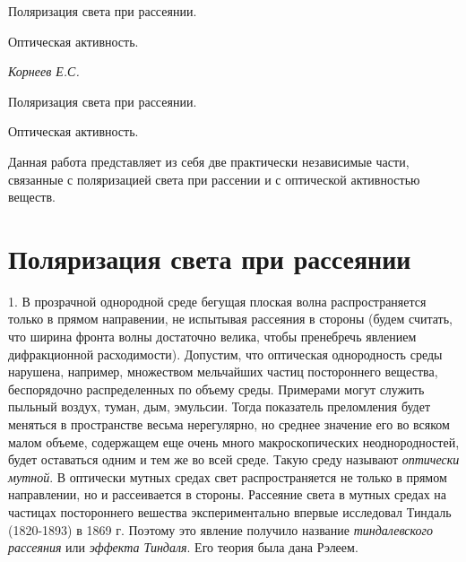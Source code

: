 \documentclass[14pt]{article}
\begin{document}
\begin{titlepage}
	\begin{center}
		\vspace*{6cm}
		\fontsize{24pt}{25pt}\selectfont
		Поляризация света при рассеянии.
		
		Оптическая активность.
	\end{center}
	\begin{flushright}
		\fontsize{18pt}{20pt}\selectfont
		\vspace{12cm}
		\hspace{-3cm}
		\textit{Корнеев Е.С.}
	\end{flushright}		
\end{titlepage}

\begin{center}
	\fontsize{16pt}{18pt}\selectfont
	Поляризация света при рассеянии.
		
	Оптическая активность.
\end{center}

\fontsize{14pt}{16pt}\selectfont
Данная работа представляет из себя две практически независимые части, связанные с поляризацией света при рассении и с оптической активностью веществ.

\section{Поляризация света при рассеянии}

1. В прозрачной однородной среде бегущая плоская волна распространяется только в прямом направении, не испытывая рассеяния в стороны (будем считать, что ширина фронта волны достаточно велика, чтобы пренебречь явлением дифракционной расходимости). Допустим, что оптическая однородность среды нарушена, например, множеством мельчайших частиц постороннего вещества, беспорядочно распределенных по объему среды. Примерами могут служить пыльный воздух, туман, дым, эмульсии. Тогда показатель преломления будет меняться в пространстве весьма нерегулярно, но среднее значение его во всяком малом объеме, содержащем еще очень много макроскопических неоднородностей, будет оставаться одним и тем же во всей среде. Такую среду называют \textsl{оптически мутной}. В оптически мутных средах свет распространяется не только в прямом направлении, но и рассеивается в стороны. Рассеяние света в мутных средах на частицах постороннего вешества экспериментально впервые исследовал Тиндаль (1820-1893) в 1869 г. Поэтому это явление получило название \textsl{тиндалевского рассеяния} или \textsl{эффекта Тиндаля}. Его теория была дана Рэлеем.
\end{document}
